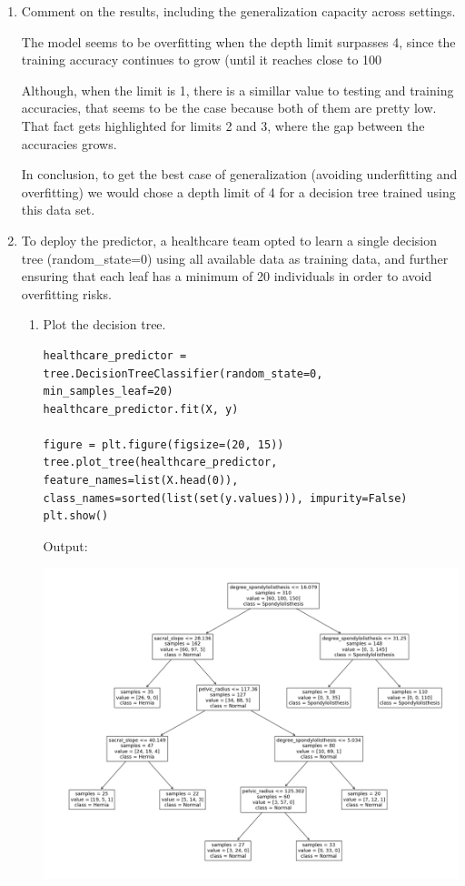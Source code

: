 \documentclass[12pt]{article}
\begin{document}
\begin{enumerate}
    \item Comment on the results, including the generalization capacity across settings.

    The model seems to be overfitting when the depth limit surpasses 4, since the training accuracy continues to grow (until it reaches close to 100%

    Although, when the limit is 1, there is a simillar value to testing and training accuracies, that seems to be the case because both of them are pretty low. That fact gets highlighted for limits 2 and 3, where the gap between the accuracies grows.

    In conclusion, to get the best case of generalization (avoiding underfitting and overfitting) we would chose a depth limit of 4 for a decision tree trained using this data set.


    \vskip 20cm

    \item To deploy the predictor, a healthcare team opted to learn a single decision tree
    (random\_state=0) using all available data as training data, and further ensuring that each leaf has
    a minimum of 20 individuals in order to avoid overfitting risks.

    \begin{enumerate}
        \item Plot the decision tree.
        \begin{lstlisting}[basicstyle=\tiny]
healthcare_predictor = tree.DecisionTreeClassifier(random_state=0, min_samples_leaf=20)
healthcare_predictor.fit(X, y)

figure = plt.figure(figsize=(20, 15))
tree.plot_tree(healthcare_predictor, feature_names=list(X.head(0)), class_names=sorted(list(set(y.values))), impurity=False)
plt.show()
        \end{lstlisting}

        Output:

        \begin{center}
            \includegraphics*[scale=0.35]{images/plot4.png}
        \end{center}
        

\end{enumerate}
\end{enumerate}
\end{document}
